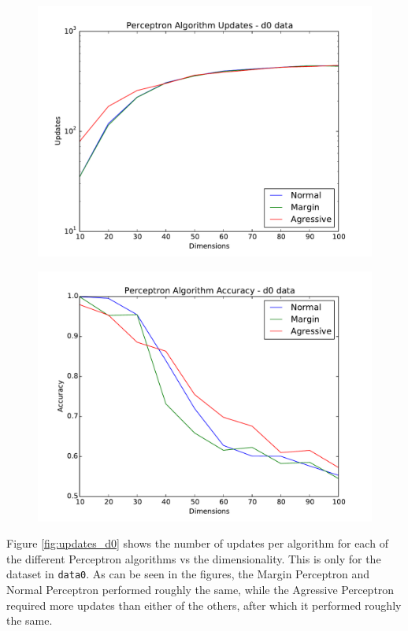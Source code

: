 \begin{enumerate}
\begin{figure}[H]
\centering
\begin{minipage}{.5\textwidth}
  \centering
  \includegraphics[width=\linewidth]{d0_updates.pdf}
  \label{fig:updates_d0}
\end{minipage}%
\begin{minipage}{.5\textwidth}
  \centering
  \includegraphics[width=\linewidth]{d0_accuracy.pdf}
  \label{fig:accuracy_d0}
\end{minipage}
\end{figure}

Figure \ref{fig:updates_d0} shows the number of updates per algorithm for each of
the different Perceptron algorithms vs the dimensionality. This is only for the
dataset in \verb~data0~. As can be seen in the figures, the Margin Perceptron and
Normal Perceptron performed roughly the same, while the Agressive Perceptron required
more updates than either of the others, after which it performed roughly the same.


\end{enumerate}
